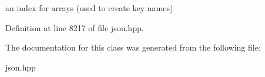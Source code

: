 an index for arrays (used to create key names) 



Definition at line 8217 of file json.\+hpp.



The documentation for this class was generated from the following file\+:\begin{DoxyCompactItemize}
\item 
json.\+hpp\end{DoxyCompactItemize}
